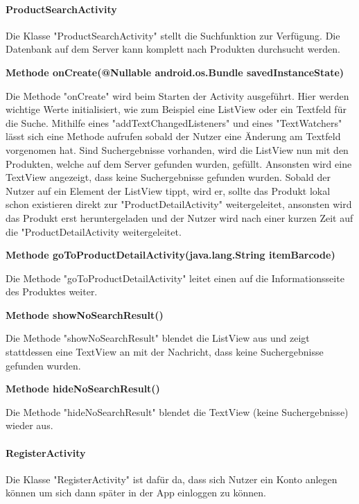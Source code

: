 \documentclass{scrartcl}
\begin{document}
\paragraph{ProductSearchActivity}
Die Klasse "ProductSearchActivity" stellt die Suchfunktion zur Verfügung. Die Datenbank auf dem Server kann komplett nach Produkten durchsucht werden. \newline 

\noindent\textbf{Methode onCreate(@Nullable android.os.Bundle savedInstanceState)}

\noindent Die Methode "onCreate" wird beim Starten der Activity ausgeführt. Hier werden wichtige Werte initialisiert, wie zum Beispiel eine ListView oder ein Textfeld für die Suche. Mithilfe eines "addTextChangedListeners" und eines "TextWatchers" lässt sich eine Methode aufrufen sobald der Nutzer eine Änderung am Textfeld vorgenomen hat. Sind Suchergebnisse vorhanden, wird die ListView nun mit den Produkten, welche auf dem Server gefunden wurden, gefüllt. Ansonsten wird eine TextView angezeigt, dass keine Suchergebnisse gefunden wurden. Sobald der Nutzer auf ein Element der ListView tippt, wird er, sollte das Produkt lokal schon existieren direkt zur "ProductDetailActivity" weitergeleitet, ansonsten wird das Produkt erst heruntergeladen und der Nutzer wird nach einer kurzen Zeit auf die "ProductDetailActivity weitergeleitet. \newline 

\noindent\textbf{Methode goToProductDetailActivity(java.lang.String itemBarcode)}
 
\noindent Die Methode "goToProductDetailActivity" leitet einen auf die Informationsseite des Produktes weiter. \newline

\noindent\textbf{Methode showNoSearchResult()}
 
\noindent Die Methode "showNoSearchResult" blendet die ListView aus und zeigt stattdessen eine TextView an mit der Nachricht, dass keine Suchergebnisse gefunden wurden. \newline 

\noindent\textbf{Methode hideNoSearchResult()}
 
\noindent Die Methode "hideNoSearchResult" blendet die TextView (keine Suchergebnisse) wieder aus. \newline 


\newpage

\paragraph{RegisterActivity}
Die Klasse "RegisterActivity" ist dafür da, dass sich Nutzer ein Konto anlegen können um sich dann später in der App einloggen zu können. \newline 
\end{document}
